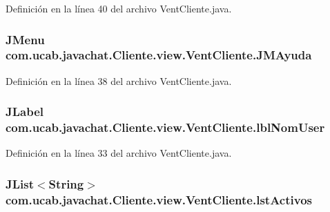 Definición en la línea 40 del archivo Vent\-Cliente.\-java.

\hypertarget{classcom_1_1ucab_1_1javachat_1_1_cliente_1_1view_1_1_vent_cliente_a0c84f912b0ec20c3de8d8d498a48d00f}{
\subsubsection[{J\-M\-Ayuda}]{\setlength{\rightskip}{0pt plus 5cm}J\-Menu com.\-ucab.\-javachat.\-Cliente.\-view.\-Vent\-Cliente.\-J\-M\-Ayuda}}\label{classcom_1_1ucab_1_1javachat_1_1_cliente_1_1view_1_1_vent_cliente_a0c84f912b0ec20c3de8d8d498a48d00f}


Definición en la línea 38 del archivo Vent\-Cliente.\-java.

\hypertarget{classcom_1_1ucab_1_1javachat_1_1_cliente_1_1view_1_1_vent_cliente_af68f442f498fbcc6ebfaf4243f05f1dd}{
\subsubsection[{lbl\-Nom\-User}]{\setlength{\rightskip}{0pt plus 5cm}J\-Label com.\-ucab.\-javachat.\-Cliente.\-view.\-Vent\-Cliente.\-lbl\-Nom\-User}}\label{classcom_1_1ucab_1_1javachat_1_1_cliente_1_1view_1_1_vent_cliente_af68f442f498fbcc6ebfaf4243f05f1dd}


Definición en la línea 33 del archivo Vent\-Cliente.\-java.

\hypertarget{classcom_1_1ucab_1_1javachat_1_1_cliente_1_1view_1_1_vent_cliente_a63d3725a08f6ebfe73015ce9560ba462}{
\subsubsection[{lst\-Activos}]{\setlength{\rightskip}{0pt plus 5cm}J\-List$<$String$>$ com.\-ucab.\-javachat.\-Cliente.\-view.\-Vent\-Cliente.\-lst\-Activos}}\label{classcom_1_1ucab_1_1javachat_1_1_cliente_1_1view_1_1_vent_cliente_a63d3725a08f6ebfe73015ce9560ba462}


